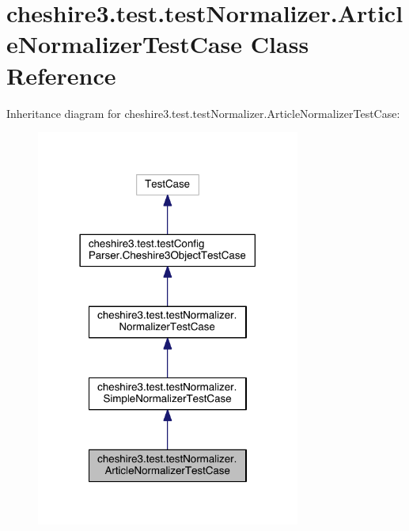 \hypertarget{classcheshire3_1_1test_1_1test_normalizer_1_1_article_normalizer_test_case}{\section{cheshire3.\-test.\-test\-Normalizer.\-Article\-Normalizer\-Test\-Case Class Reference}
\label{classcheshire3_1_1test_1_1test_normalizer_1_1_article_normalizer_test_case}
}


Inheritance diagram for cheshire3.\-test.\-test\-Normalizer.\-Article\-Normalizer\-Test\-Case\-:
\nopagebreak
\begin{figure}[H]
\begin{center}
\leavevmode
\includegraphics[width=246pt]{classcheshire3_1_1test_1_1test_normalizer_1_1_article_normalizer_test_case__inherit__graph}
\end{center}
\end{figure}


